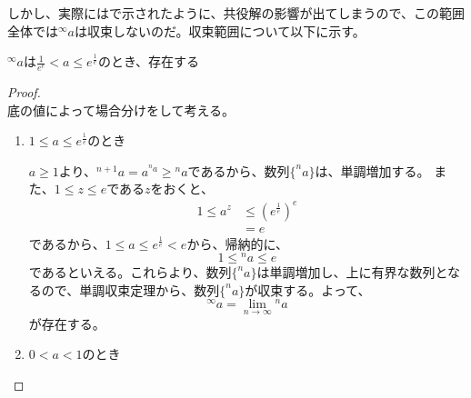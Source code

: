 	しかし、実際にはで示されたように、共役解の影響が出てしまうので、この範囲全体では$^\infty a$は収束しないのだ。収束範囲について以下に示す。
	\begin{theorem}
	\label{th:tetration_convergence}
		$^\infty a$は$\frac{1}{e^e} < a \leq e^\frac{1}{e}$のとき、存在する
	\end{theorem}
	\begin{proof} \mbox{}\\
		底の値によって場合分けをして考える。
		\begin{enumerate}
			\item $1 \leq a \leq e^\frac{1}{e}$のとき
			
				$a \geq 1$より、$^{n+1} a = a ^{^n a} \geq {^n a}$であるから、数列$\{^n a\}$は、単調増加する。
				また、$1 \leq z \leq e$である$z$をおくと、
				\begin{align*}
					1 \leq a^z &\leq (e^\frac{1}{e})^e \\
							 &= e
				\end{align*}
				であるから、$1 \leq a \leq e^\frac{1}{e} < e$から、帰納的に、
				\begin{equation*}
					1 \leq {^n a} \leq e
				\end{equation*}
				であるといえる。これらより、数列$\{^n a\}$は単調増加し、上に有界な数列となるので、単調収束定理から、数列$\{^n a\}$が収束する。よって、
				\begin{equation*}
					^\infty a = \lim_{n \to \infty} {^n a}
				\end{equation*}
				が存在する。
			
			\item $0 < a < 1$のとき
		\end{enumerate}
	\end{proof}
	
	